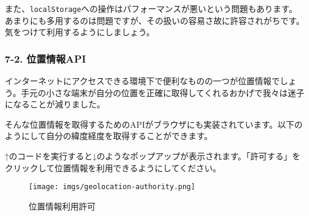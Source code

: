 また、\texttt{localStorage}への操作はパフォーマンスが悪いという問題もあります。あまりにも多用するのは問題ですが、その扱いの容易さ故に許容されがちです。気をつけて利用するようにしましょう。

\subsubsection{7-2. 位置情報API}\label{ux4f4dux7f6eux60c5ux5831api}

インターネットにアクセスできる環境下で便利なものの一つが位置情報でしょう。手元の小さな端末が自分の位置を正確に取得してくれるおかげで我々は迷子になることが減りました。

そんな位置情報を取得するためのAPIがブラウザにも実装されています。以下のようにして自分の緯度経度を取得することができます。

\begin{Shaded}
\begin{Highlighting}[]
\NormalTok{ (}  \NormalTok{) \{}
  \OperatorTok{=} \OperatorTok{;}
\KeywordTok{=\textgreater{}}\NormalTok{ \{}
    \NormalTok{(}\SpecialCharTok{$\{}\SpecialCharTok{\}}\SpecialCharTok{$\{}\SpecialCharTok{\}}\VerbatimStringTok{\textasciigrave{}}\NormalTok{)}\OperatorTok{;}
\NormalTok{  \})}\OperatorTok{;}
\NormalTok{\} }\NormalTok{ \{}
  \NormalTok{(}\NormalTok{)}\OperatorTok{;}
\NormalTok{\}}
\end{Highlighting}
\end{Shaded}

↑のコードを実行すると↓のようなポップアップが表示されます。「許可する」をクリックして位置情報を利用できるようにしてください。

\begin{figure}
\centering
\texttt{[image: imgs/geolocation-authority.png]}
\caption{位置情報利用許可}
\end{figure}


